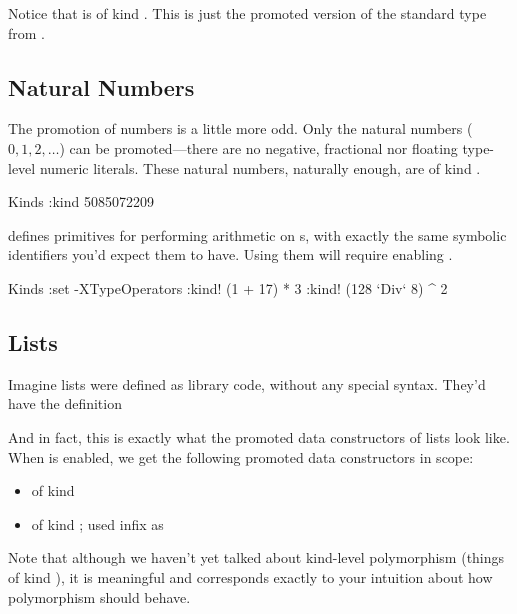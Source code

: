 \documentclass[book.tex]{subfiles}
\begin{document}
Notice that  is of kind . This
 is just the  promoted version of the standard
 type from .


\subsection{Natural Numbers}

The promotion of numbers is a little more odd. Only the natural numbers ($0, 1,
2, \ldots$) can be promoted---there are no negative, fractional nor floating
type-level numeric literals. These natural numbers, naturally enough, are of
kind .

\begin{dorepl}{Kinds}
:kind 5085072209
\end{dorepl}

 defines primitives for performing arithmetic on s,
with exactly the same symbolic identifiers you'd expect them to have. Using them
will require enabling .

\begin{dorepl}{Kinds}
:set -XTypeOperators
:kind! (1 + 17) * 3
:kind! (128 `Div` 8) ^ 2
\end{dorepl}


\subsection{Lists}

Imagine lists were defined as library code, without any special syntax. They'd
have the definition


And in fact, this is exactly what the promoted data constructors of lists look
like. When  is enabled, we get the following promoted data
constructors in scope:

\begin{itemize}
  \item{ of kind \kind{[a]}}
  \item{ of kind ; used infix as }
\end{itemize}

Note that although we haven't yet talked about kind-level polymorphism (things
of kind ), it is meaningful and corresponds exactly to your intuition
about how polymorphism should behave.
\end{document}
